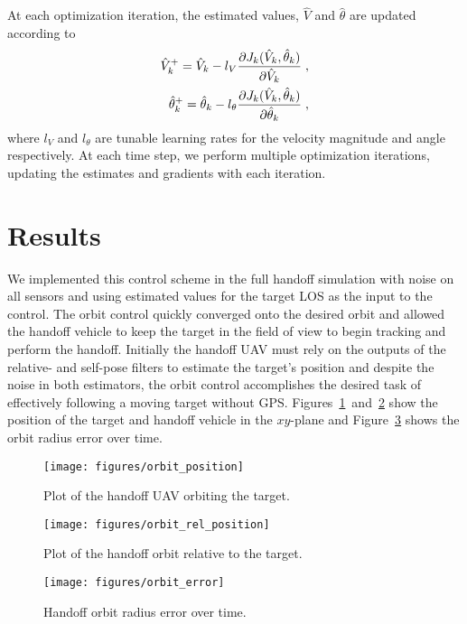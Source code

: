 At each optimization iteration, the estimated values, $\hat{V}$ and $\hat{\theta}$ are updated according to
\begin{align}
    \hat{V}^+_{k} = \hat{V}_{k} - l_V \pardd[J_k(\hat{V}_{{k}},\hat{\theta}_{k})]{\hat{V}_{{k}}}\;, \\
    \hat{\theta}^+_{k} = \hat{\theta}_{k} - l_\theta \pardd[J_k(\hat{V}_{{k}},\hat{\theta}_{k})]{\hat{\theta}_{k}}\;,
\end{align}
where $l_V$ and $l_\theta$ are tunable learning rates for the velocity magnitude and angle respectively.
At each time step, we perform multiple optimization iterations, updating the estimates and gradients with each iteration.


\section{Results}
We implemented this control scheme in the full handoff simulation with noise on all sensors and using estimated values for the target LOS as the input to the control. The orbit control quickly converged onto the desired orbit and allowed the handoff vehicle to keep the target in the field of view to begin tracking and perform the handoff. Initially the handoff UAV must rely on the outputs of the relative- and self-pose filters to estimate the target's position and despite the noise in both estimators, the orbit control accomplishes the desired task of effectively following a moving target without GPS. Figures~\ref{fig:orbit_position}~and~\ref{fig:orbit_rel_position} show the position of the target and handoff vehicle in the $xy$-plane and Figure~\ref{fig:orbit_error} shows the orbit radius error over time.

\begin{figure}[hbt]
  \centering
  \texttt{[image: figures/orbit\_position]}
  \caption{Plot of the handoff UAV orbiting the target.}
  \label{fig:orbit_position}
\end{figure}

\begin{figure}[hbt]
  \centering
  \texttt{[image: figures/orbit\_rel\_position]}
  \caption{Plot of the handoff orbit relative to the target.}
  \label{fig:orbit_rel_position}
\end{figure}

\begin{figure}[hbt]
  \centering
  \texttt{[image: figures/orbit\_error]}
  \caption{Handoff orbit radius error over time.}
  \label{fig:orbit_error}
\end{figure}
